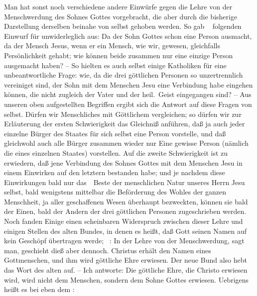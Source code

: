 \begin{RWanm} Man hat sonst noch verschiedene andere Einwürfe gegen die Lehre von der Menschwerdung des Sohnes Gottes vorgebracht, die aber durch die bisherige Darstellung derselben beinahe von selbst gehoben werden. So gab \zB\  folgenden Einwurf für unwiderleglich aus: Da der Sohn Gottes schon eine Person ausmacht, da der Mensch Jesus, wenn er ein Mensch, wie wir, gewesen, gleichfalls Persönlichkeit gehabt; wie können beide zusammen nur eine einzige Person ausgemacht haben? -- So hielten es auch selbst einige Katholiken für eine unbeantwortliche Frage: wie, da die drei göttlichen Personen so unzertrennlich vereiniget sind, der Sohn mit dem Menschen Jesu eine Verbindung habe eingehen können, die nicht zugleich der Vater und der heil.\ Geist eingegangen sind? -- Aus unseren oben aufgestellten Begriffen ergibt sich die Antwort auf diese Fragen von selbst. Dürfen wir Menschliches mit Göttlichem vergleichen; so dürfen wir zur Erläuterung der ersten Schwierigkeit das Gleichniß anführen, daß ja auch jeder einzelne Bürger des Staates für sich selbst eine Person vorstelle, und daß gleichwohl auch alle Bürger zusammen wieder nur Eine gewisse Person (nämlich die eines einzelnen Staates) vorstellen. Auf die zweite Schwierigkeit ist zu erwiedern, daß jene Verbindung des Sohnes Gottes mit dem Menschen Jesu in einem Einwirken auf den letztern bestanden habe; und je nachdem diese Einwirkungen bald nur das~\ Beste der menschlichen Natur unseres Herrn Jesu selbst, bald wenigstens mittelbar die Beförderung des Wohles der ganzen Menschheit, ja aller geschaffenen Wesen überhaupt bezweckten, können sie bald der Einen, bald der Andern der drei göttlichen Personen zugeschrieben werden. Noch fanden Einige einen scheinbaren Widerspruch zwischen dieser Lehre und einigen Stellen des alten Bundes, in denen es heißt, daß Gott seinen Namen auf kein Geschöpf übertragen werde; \zB\ :  In der Lehre von der Menschwerdung, sagt man, geschieht dieß aber dennoch. Christus erhält den Namen eines Gottmenschen, und ihm wird göttliche Ehre erwiesen. Der neue Bund also hebt das Wort des alten auf. -- Ich antworte: Die göttliche Ehre, die Christo erwiesen wird, wird nicht dem Menschen, sondern dem Sohne Gottes erwiesen. Uebrigens heißt es bei eben dem : 
\end{RWanm}

